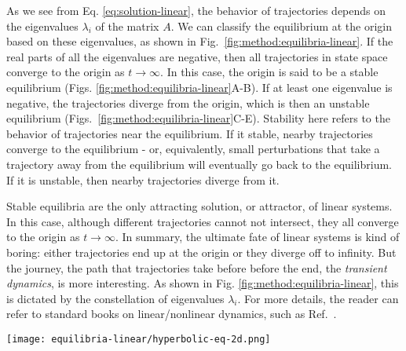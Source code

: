 As we see from Eq. \ref{eq:solution-linear}, the behavior of trajectories depends on the eigenvalues $\lambda_i$ of the matrix $A$. We can classify the equilibrium at the origin based on these eigenvalues, as shown in Fig.~\ref{fig:method:equilibria-linear}. If the real parts of all the eigenvalues are negative, then all trajectories in state space converge to the origin as $t \to \infty$. In this case, the origin is said to be a stable equilibrium (Figs. \ref{fig:method:equilibria-linear}A-B). If at least one eigenvalue is negative, the trajectories diverge from the origin, which is then an unstable equilibrium (Figs.~\ref{fig:method:equilibria-linear}C-E). Stability here refers to the behavior of trajectories near the equilibrium. If it stable, nearby trajectories converge to the equilibrium - or, equivalently, small perturbations that take a trajectory away from the equilibrium will eventually go back to the equilibrium. If it is unstable, then nearby trajectories diverge from it.


Stable equilibria are the only attracting solution, or attractor, of linear systems. In this case, although different trajectories cannot not intersect, they all converge to the origin as $t \to \infty$. %
In summary, the ultimate fate of linear systems is kind of boring: either trajectories end up at the origin or they diverge off to infinity. But the journey, the path that trajectories take before before the end, the \textit{transient dynamics}, is more interesting. As shown in Fig. \ref{fig:method:equilibria-linear}, this is dictated by the constellation of eigenvalues $\lambda_i$. For more details, the reader can refer to standard books on linear/nonlinear dynamics, such as Ref.~\cite{strogatz2002nonlinear}. 
%
\begin{figure*}
    \centering 
    \texttt{[image: equilibria-linear/hyperbolic-eq-2d.png]}
    \caption{Hyperbolic equilibria in 2D linear systems. The title specifies the number of eigenvalues that are purely real negative $r_-$ or positive $r_+$, or that are complex with real part negative $c_-$ or positive $c_+$. The first row shows equilibria whose eigenvalues are purely real, while the second one shows equilibria with complex eigenvalues. In the first column, the equilibria are stable - they are the two possible attractors in linear systems. In the second column, we have a saddle-point for purely real eigenvalues. In the third column, the equilibria are completely unstable, known as repellers.  }
    \label{fig:method:equilibria-linear}
\end{figure*}




